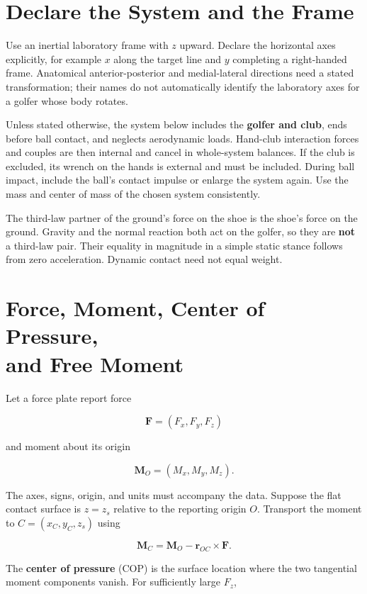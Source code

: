 \section{Declare the System and the Frame}\label{sec:grf-definition}\label{grf-declare-the-system-and-the-frame}

Use an inertial laboratory frame with \(z\) upward. Declare the horizontal axes explicitly, for example \(x\) along the target line and \(y\) completing a right-handed frame. Anatomical anterior-posterior and medial-lateral directions need a stated transformation; their names do not automatically identify the laboratory axes for a golfer whose body rotates.

Unless stated otherwise, the system below includes the \textbf{golfer and club}, ends before ball contact, and neglects aerodynamic loads. Hand-club interaction forces and couples are then internal and cancel in whole-system balances. If the club is excluded, its wrench on the hands is external and must be included. During ball impact, include the ball's contact impulse or enlarge the system again. Use the mass and center of mass of the chosen system consistently.

The third-law partner of the ground's force on the shoe is the shoe's force on the ground. Gravity and the normal reaction both act on the golfer, so they are \textbf{not} a third-law pair. Their equality in magnitude in a simple static stance follows from zero acceleration. Dynamic contact need not equal weight.

\section[Force, Moment, Center of Pressure, and Free Moment]{Force, Moment, Center of Pressure,\\and Free Moment}\label{grf-force-moment-center-of-pressure-and-free-moment}

Let a force plate report force

\[
\bm{F}=(F_x,F_y,F_z)
\]

and moment about its origin

\[
\bm{M}_O=(M_x,M_y,M_z).
\]

The axes, signs, origin, and units must accompany the data. Suppose the flat contact surface is \(z=z_s\) relative to the reporting origin \(O\). Transport the moment to \(C=(x_C,y_C,z_s)\) using

\[
\bm M_C=\bm M_O-\bm r_{OC}\times\bm F.
\]

The \textbf{center of pressure} (COP) is the surface location where the two tangential moment components vanish. For sufficiently large \(F_z\),

